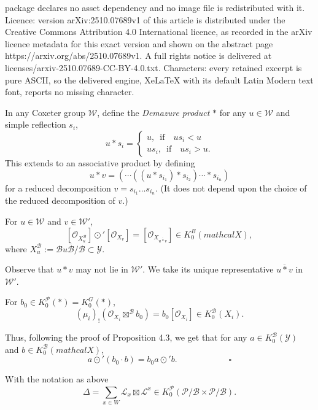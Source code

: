 \documentclass[10pt,a4paper]{amsart}
\def\B{\mathcal{B}}
\def\L{\mathcal{L}}
\def\P{\mathcal{P}}
\def\W{\mathcal{W}}
\def\Y{\mathcal{Y}}
\def\ref#1{#1}
\newcommand{\X}{mathcal{X}}
\begin{document}
package declares no asset dependency and no image file is redistributed with it. Licence: version arXiv:2510.07689v1 of this article is distributed under the Creative Commons Attribution 4.0 International licence, as recorded in the arXiv licence metadata for this exact version and shown on the abstract page https://arxiv.org/abs/2510.07689v1. A full rights notice is delivered at licenses/arxiv-2510.07689-CC-BY-4.0.txt. Characters: every retained excerpt is pure ASCII, so the delivered engine, XeLaTeX with its default Latin Modern text font, reports no missing character.
\begin{definition}\label{4.2}
\rm{
In any Coxeter group $\W$,  define the {\it Demazure product} $*$ for any $u\in \W$ and simple reflection $s_i$,
$$
u* s_i=
\left\{ \begin{array}{l}
u,\,\,\,  \mbox{if}\quad us_i <u\\
us_i,\,\,\, \mbox{if}\quad us_i >u.
\end{array}\right.
$$
This extends to an associative product by defining 
$$u*v= (\cdots (( u*s_{i_1})*s_{i_2})\cdots *s_{i_n})$$
 for a reduced decomposition $v=s_{i_1}\ldots s_{i_n}$. (It does not depend upon the choice of the reduced decomposition of $v$.)}
\end{definition}

\begin{proposition} \label{4.3}
For $u\in \W$ and $v\in \W'$,
$$
\left[\mathcal{O}_{X^\B_u}\right] \odot'\left [\mathcal{O}_{X_v}\right] =\left [\mathcal{O}_{X_{\overline{u*v}}}\right] \in K_0^B\left(\X\right) ,
$$
where ${X^\B_u}:= \overline{\B u\B/\B} \subset \Y$.

Observe that $u*v$ may not lie in $\W'$. We take its unique representative $\overline{u*v}$ in $\W'$. 
\end{proposition}

\begin{corollary} \label{4.5}
For  $b_0 \in K_0^\P (*) = K_0^G (*)$,
$$
\left(\mu_i\right)_! \left( \mathcal{O}_{X_i} \boxtimes^\B b_0\right) =b_0 \left[\mathcal{O}_{X_i}\right] \in K_0^\B\left(X_i\right).
$$

Thus, following the proof of Proposition \ref{4.3}, we get that for any $a\in K_0^\B\left(\Y \right)$ and $b\in K_0^\B\left(\X\right)$,
$$
a\odot' \left(b_0\cdot b\right) = b_0a\odot' b. \qquad\qquad\qquad \square
$$
\end{corollary} 

\begin{lemma} \label{4.7}
With the notation as above
$$
\Delta =\sum_{x\in W}\L_x \boxtimes \L^x \in K_0^\P \left(\P/\B \times \P/\B\right). 
$$
\end{lemma}
\end{document}
